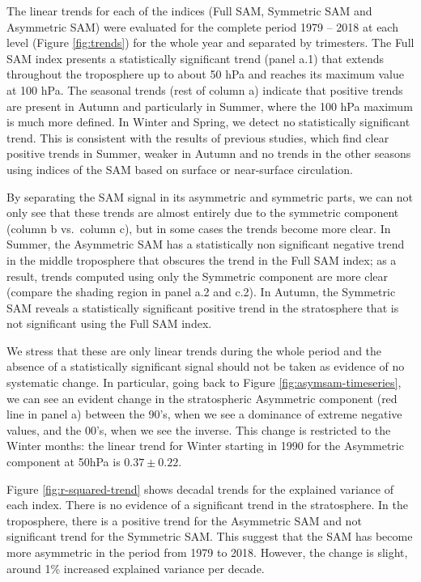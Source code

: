 \documentclass[smallextended]{svjour3}       %
\begin{document}
The linear trends for each of the indices (Full SAM, Symmetric SAM and Asymmetric SAM) were evaluated for the complete period 1979 -- 2018 at each level (Figure \ref{fig:trends}) for the whole year and separated by trimesters. The Full SAM index presents a statistically significant trend (panel a.1) that extends throughout the troposphere up to about 50 hPa and reaches its maximum value at 100 hPa. The seasonal trends (rest of column a) indicate that positive trends are present in Autumn and particularly in Summer, where the 100 hPa maximum is much more defined. In Winter and Spring, we detect no statistically significant trend. This is consistent with the results of previous studies, which find clear positive trends in Summer, weaker in Autumn and no trends in the other seasons \citep[e.g.][ and references therein]{fogt2020} using indices of the SAM based on surface or near-surface circulation.

By separating the SAM signal in its asymmetric and symmetric parts, we can not only see that these trends are almost entirely due to the symmetric component (column b vs.~column c), but in some cases the trends become more clear. In Summer, the Asymmetric SAM has a statistically non significant negative trend in the middle troposphere that obscures the trend in the Full SAM index; as a result, trends computed using only the Symmetric component are more clear (compare the shading region in panel a.2 and c.2). In Autumn, the Symmetric SAM reveals a statistically significant positive trend in the stratosphere that is not significant using the Full SAM index.

We stress that these are only linear trends during the whole period and the absence of a statistically significant signal should not be taken as evidence of no systematic change. In particular, going back to Figure \ref{fig:asymsam-timeseries}, we can see an evident change in the stratospheric Asymmetric component (red line in panel a) between the 90's, when we see a dominance of extreme negative values, and the 00's, when we see the inverse. This change is restricted to the Winter months: the linear trend for Winter starting in 1990 for the Asymmetric component at 50hPa is \(0.37 \pm 0.22\).

Figure \ref{fig:r-squared-trend} shows decadal trends for the explained variance of each index. There is no evidence of a significant trend in the stratosphere. In the troposphere, there is a positive trend for the Asymmetric SAM and not significant trend for the Symmetric SAM. This suggest that the SAM has become more asymmetric in the period from 1979 to 2018. However, the change is slight, around 1\% increased explained variance per decade.
\end{document}
